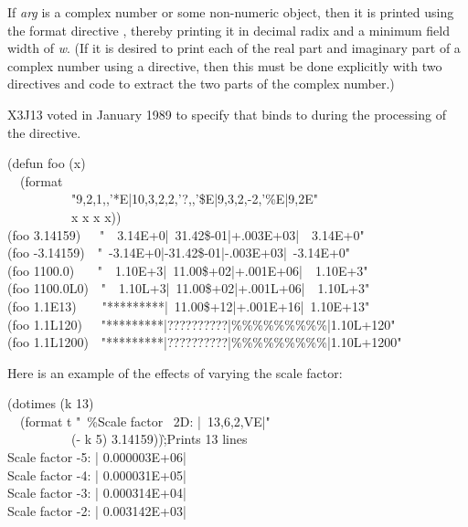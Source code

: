 \begin{flushdesc}
If \emph{arg} is a complex number or some non-numeric
object, then it is printed using the format directive ,
thereby printing it in decimal radix and a minimum field width of \emph{w}.
(If it is desired to print each of the real part and imaginary part
of a complex number using a  directive, then this must
be done explicitly with two  directives and code to
extract the two parts of the complex number.)

\begin{new}
X3J13 voted in January 1989
to specify that  binds  to 
during the processing of the  directive.
\end{new}

\begin{lisp}
(defun foo (x) \\
~~(format {\nil} \\
~~~~~~~~~~"{\Xtilde}9,2,1,,'*E|{\Xtilde}10,3,2,2,'?,,'\$E|{\Xtilde}9,3,2,-2,'\%{\Xatsign}E|{\Xtilde}9,2E" \\
~~~~~~~~~~x x x x)) \\
(foo 3.14159)~~\EV\ "~~3.14E+0|~31.42\$-01|+.003E+03|~~3.14E+0" \\
(foo -3.14159)~\EV\ "~-3.14E+0|-31.42\$-01|-.003E+03|~-3.14E+0" \\
(foo 1100.0) ~~\EV\ "~~1.10E+3|~11.00\$+02|+.001E+06|~~1.10E+3" \\
(foo 1100.0L0)~\EV\ "~~1.10L+3|~11.00\$+02|+.001L+06|~~1.10L+3" \\
(foo 1.1E13)~~~\EV\ "*********|~11.00\$+12|+.001E+16|~1.10E+13" \\
(foo 1.1L120)~~\EV\ "*********|??????????|\%\%\%\%\%\%\%\%\%|1.10L+120" \\
(foo 1.1L1200)~\EV\ "*********|??????????|\%\%\%\%\%\%\%\%\%|1.10L+1200"
\end{lisp}
Here is an example of the effects of varying the scale factor:
\begin{lisp}
(dotimes (k 13) \\
~~(format t "~\%Scale factor ~2D: |~13,6,2,VE|" \\
~~~~~~~~~~(- k 5) 3.14159))\`;\textrm{Prints 13 lines} \\
Scale factor -5: | 0.000003E+06| \\
Scale factor -4: | 0.000031E+05| \\
Scale factor -3: | 0.000314E+04| \\
Scale factor -2: | 0.003142E+03| \\

\end{lisp}
\end{flushdesc}

